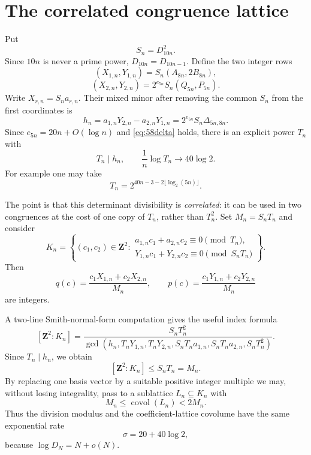 \documentclass[11pt]{article}
\newcommand{\Z}{\mathbf Z}
\begin{document}
\section{The correlated congruence lattice}

Put
\[
 S_n=D_{10n}^2.
\]
Since $10n$ is never a prime power, $D_{10n}=D_{10n-1}$.  Define the two
integer rows
\[
 (X_{1,n},Y_{1,n})
 =S_n(A_{8n},2B_{8n}),
\]
\[
 (X_{2,n},Y_{2,n})
 =2^{e_{5n}}S_n(Q_{5n},P_{5n}).
\]
Write $X_{r,n}=S_na_{r,n}$.  Their mixed minor after removing the common
$S_n$ from the first coordinates is
\[
 h_n=a_{1,n}Y_{2,n}-a_{2,n}Y_{1,n}
 =2^{e_{5n}}S_n\Delta_{5n,8n}.
\]
Since $e_{5n}=20n+O(\log n)$ and \eqref{eq:58delta} holds, there is an
explicit power $T_n$ with
\begin{equation}\label{eq:T}
 T_n\mid h_n,
 \qquad
 \frac1n\log T_n\to40\log2.
\end{equation}
For example one may take
\[
 T_n=2^{40n-3-2\lfloor\log_2(5n)\rfloor}.
\]

The point is that this determinant divisibility is \emph{correlated}: it can
be used in two congruences at the cost of one copy of $T_n$, rather than
$T_n^2$.  Set $M_n=S_nT_n$ and consider
\[
 K_n=\left\{(c_1,c_2)\in\Z^2:
 \begin{array}{l}
 a_{1,n}c_1+a_{2,n}c_2\equiv0\pmod{T_n},\\
 Y_{1,n}c_1+Y_{2,n}c_2\equiv0\pmod{S_nT_n}
 \end{array}
 \right\}.
\]
Then
\[
 q(c)=\frac{c_1X_{1,n}+c_2X_{2,n}}{M_n},
 \qquad
 p(c)=\frac{c_1Y_{1,n}+c_2Y_{2,n}}{M_n}
\]
are integers.

A two-line Smith-normal-form computation gives the useful index formula
\[
 [\Z^2:K_n]
 =\frac{S_nT_n^2}
 {\gcd(h_n,T_nY_{1,n},T_nY_{2,n},S_nT_na_{1,n},S_nT_na_{2,n},S_nT_n^2)}.
\]
Since $T_n\mid h_n$, we obtain
\begin{equation}\label{eq:index}
 [\Z^2:K_n]\le S_nT_n=M_n.
\end{equation}
By replacing one basis vector by a suitable positive integer multiple we may,
without losing integrality, pass to a sublattice $L_n\subseteq K_n$ with
\begin{equation}\label{eq:covol}
 M_n\le\operatorname{covol}(L_n)<2M_n.
\end{equation}
Thus the division modulus and the coefficient-lattice covolume have the same
exponential rate
\begin{equation}\label{eq:sigma}
 \sigma=20+40\log2,
\end{equation}
because $\log D_N=N+o(N)$.
\end{document}
